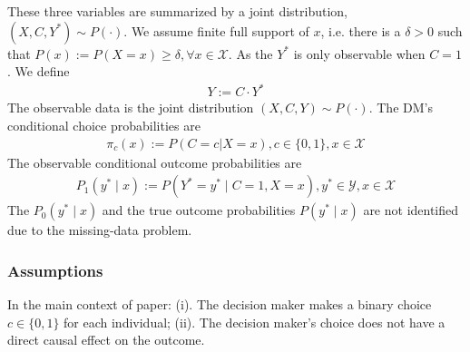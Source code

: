 These three variables are summarized by a joint distribution, $(X,C,Y^*)\sim P(\cdot)$. We assume finite full support of $x$, i.e. there is a $\delta>0$ such that $P(x):=P(X=x)\geq \delta,\forall x\in \mathcal{X}$. As the $Y^*$ is only observable when $C=1$. We define
\begin{equation}
    \begin{aligned}
        Y:=C\cdot Y^*
    \end{aligned}
    \nonumber
\end{equation}
The observable data is the joint distribution $(X,C,Y)\sim P(\cdot)$. The DM's conditional choice probabilities are
\begin{equation}
    \begin{aligned}
        \pi_c(x):=P(C=c|X=x),c\in\{0,1\},x\in \mathcal{X}
    \end{aligned}
    \nonumber
\end{equation}
The observable conditional outcome probabilities are
\begin{equation}
    \begin{aligned}
        P_1(y^*\mid x):=P(Y^*=y^*\mid C=1, X=x),y^*\in \mathcal{Y},x\in \mathcal{X}
    \end{aligned}
    \nonumber
\end{equation}
The $P_0(y^*\mid x)$ and the true outcome probabilities $P(y^*\mid x)$ are not identified due to the missing-data problem.

\subsubsection*{Assumptions}
\begin{note}
    In the main context of paper: (i). The decision maker makes a binary choice $c\in\{0,1\}$ for each individual; (ii). The decision maker's choice does not have a direct causal effect on the outcome.
\end{note}

